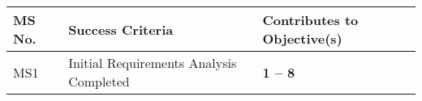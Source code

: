 \documentclass[a4paper,11pt]{article}
\begin{document}
\setcounter{ms}{0}
\vspace{20pt}
\begin{center}
\begin{tabular*}{\textwidth}{|p{1.2cm}|p{13.3cm}|p{2.2cm}|}\hline
\textbf{MS No.} & \textbf{Success Criteria} & \textbf{Contributes to
  Objective(s)} \\
  \hline
MS1 & Initial Requirements Analysis Completed & \textbf{1 -- 8} \\
  \hline
\end{tabular*}
\end{center}

\newpage
{}
\label{sect:deliverables}
\end{document}
